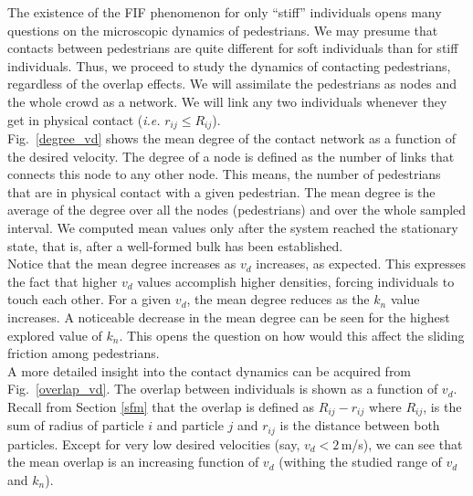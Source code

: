 \documentclass[preprint,12pt]{elsarticle}
\begin{document}
The existence of the FIF phenomenon for only ``stiff'' individuals opens many
questions  on the microscopic dynamics of pedestrians. We may presume that
contacts  between pedestrians are quite different for soft individuals than for
stiff  individuals. Thus, we proceed to study the dynamics of contacting
pedestrians, regardless of the overlap  effects. We will assimilate the
pedestrians as nodes and the whole crowd as a  network. We will link any two
individuals whenever they get in physical  contact (\textit{i.e.} $r_{ij} \leq
R_{ij}$).\\

Fig.~\ref{degree_vd} shows the mean degree of the contact network as a function
of the desired velocity. The degree of a node is defined as the number of links
that connects this node to any other node. This means, the number of pedestrians
that are in physical contact with a given pedestrian. The mean degree is the
average of the degree over all the nodes (pedestrians) and over the whole
sampled interval. We computed mean values only after the system reached the
stationary  state, that is, after a well-formed bulk has been established.\\

Notice that the mean degree increases as $v_d$ increases, as expected. This
expresses the fact that higher $v_d$ values accomplish higher densities, forcing
individuals to touch each  other. For a given $v_d$, the mean degree reduces as
the $k_n$  value increases. A noticeable decrease in the mean degree can be seen
for the  highest explored value of $k_n$. This opens the question on how would
this affect the sliding friction among pedestrians.\\

A more detailed insight into the contact dynamics can be acquired from
Fig.~\ref{overlap_vd}. The overlap between individuals is shown as a function of
$v_d$. Recall from Section \ref{sfm} that the overlap is defined as
$R_{ij}-r_{ij}$ where $R_{ij}$, is the sum of radius of particle $i$ and
particle $j$ and $r_{ij}$  is the distance between both particles. Except for
very low desired velocities (say, $v_d<2\,$m/s), we can see that the mean
overlap is an increasing function of $v_d$ (withing the studied range of $v_d$
and $k_n$).\\
\end{document}
